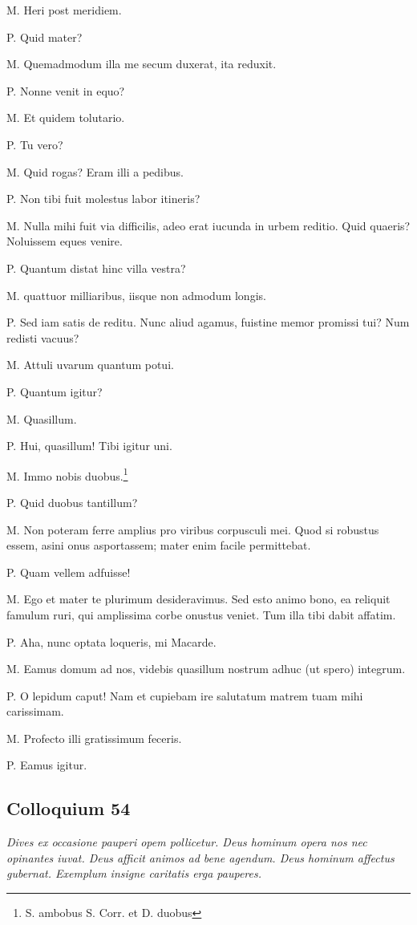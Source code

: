 \documentclass{article}
\begin{document}
M. Heri post meridiem. 

P. Quid mater?

M. Quemadmodum illa me secum duxerat, ita reduxit. 

P. Nonne venit in equo?

M. Et quidem tolutario. 

P. Tu vero?

M. Quid rogas? Eram illi a pedibus. 

P. Non tibi fuit molestus labor itineris?

M. Nulla mihi fuit via difficilis, adeo erat iucunda in urbem reditio. Quid quaeris? Noluissem eques venire. 

P. Quantum distat hinc villa vestra?

M. quattuor milliaribus, iisque non admodum longis. 

P. Sed iam satis de reditu. Nunc aliud agamus, fuistine memor promissi tui? Num redisti vacuus?

M. Attuli uvarum quantum potui. 

P. Quantum igitur?

M. Quasillum. 

P. Hui, quasillum! Tibi igitur uni. 

M. Immo nobis duobus.\footnote{S. ambobus S. Corr. et D. duobus}

P. Quid duobus tantillum?

M. Non poteram ferre amplius pro viribus corpusculi mei. Quod si robustus essem, asini onus asportassem; mater enim facile permittebat. 

P. Quam vellem adfuisse!

M. Ego et mater te plurimum desideravimus. Sed esto animo bono, ea reliquit famulum ruri, qui amplissima corbe onustus veniet. Tum illa tibi dabit affatim. 

P. Aha, nunc optata loqueris, mi Macarde. 

M. Eamus domum ad nos, videbis quasillum nostrum adhuc (ut spero) integrum. 

P. O lepidum caput! Nam et cupiebam ire salutatum matrem tuam mihi carissimam. 

M. Profecto illi gratissimum feceris. 

P. Eamus igitur. 

\subsection{Colloquium 54}
\emph{Dives ex occasione pauperi opem pollicetur. Deus hominum opera nos nec opinantes iuvat. Deus afficit animos ad bene agendum. Deus hominum affectus gubernat. Exemplum insigne caritatis erga pauperes.}
\end{document}
